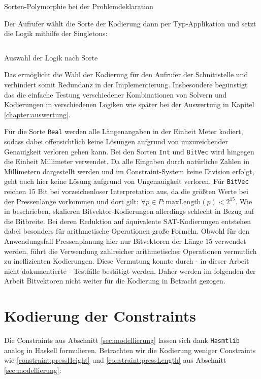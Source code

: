 \begin{listing}[H]
    \inputminted[linenos=true]{haskell}{Code/Implementierung/SortPoly.hs}
    \caption{Sorten-Polymorphie bei der Problemdeklaration}
    \label{listing:implsortpoly}
\end{listing}

Der Aufrufer wählt die Sorte der Kodierung dann per Typ-Applikation und setzt die Logik mithilfe der Singletons:

\begin{listing}[H]
    \inputminted[linenos=true]{haskell}{Code/Implementierung/SortPolySetLogic.hs}
    \caption{Auswahl der Logik nach Sorte}
    \label{listing:implsortpolylogic}
\end{listing}

Das ermöglicht die Wahl der Kodierung für den Aufrufer der Schnittstelle und verhindert somit Redundanz in der Implementierung.
Insbesondere begünstigt das die einfache Testung verschiedener Kombinationen von Solvern und Kodierungen in verschiedenen Logiken wie später bei der Auswertung in Kapitel \ref{chapter:auswertung}.

Für die Sorte \texttt{Real} werden alle Längenangaben in der Einheit Meter kodiert, sodass dabei offensichtlich keine Lösungen aufgrund von unzureichender Genauigkeit verloren gehen kann.
Bei den Sorten \texttt{Int} und \texttt{BitVec} wird hingegen die Einheit Millimeter verwendet.
Da alle Eingaben durch natürliche Zahlen in Millimetern dargestellt werden und im Constraint-System keine Division erfolgt, geht auch hier keine Lösung aufgrund von Ungenauigkeit verloren.
Für \texttt{BitVec} reichen 15 Bit bei vorzeichenloser Interpretation aus, da die größten Werte bei der Pressenlänge vorkommen und dort gilt: $\forall p \in P: \text{maxLength}(p) < 2^{15}$.
Wie in \cite{bitblasting} beschrieben, skalieren Bitvektor-Kodierungen allerdings schlecht in Bezug auf die Bitbreite.
Bei deren Reduktion auf äquivalente SAT-Kodierungen entstehen dabei besonders für arithmetische Operationen große Formeln.
Obwohl für den Anwendungsfall Pressenplanung hier nur Bitvektoren der Länge 15 verwendet werden, führt die Verwendung zahlreicher arithmetischer Operationen
vermutlich zu ineffizienten Kodierungen.
Diese Vermutung konnte durch - in dieser Arbeit nicht dokumentierte - Testfälle bestätigt werden.
Daher werden im folgenden der Arbeit Bitvektoren nicht weiter für die Kodierung in Betracht gezogen.

\section{Kodierung der Constraints}
\label{sec:kodierungconstraints}
Die Constraints aus Abschnitt \ref{sec:modellierung} lassen sich dank \texttt{Hasmtlib} analog in Haskell formulieren.
Betrachten wir die Kodierung weniger Constraints wie \ref{constraint:pressHeight} und \ref{constraint:pressLength} aus Abschnitt \ref{sec:modellierung}:

